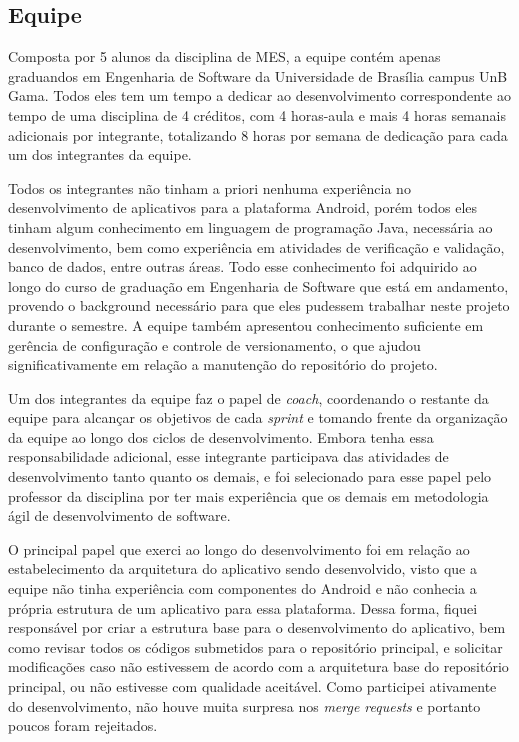 \subsection{Equipe}
Composta por 5 alunos da disciplina de MES, a equipe contém apenas graduandos em Engenharia de Software da Universidade de Brasília campus UnB Gama. Todos eles tem um tempo a dedicar ao desenvolvimento correspondente ao tempo de uma disciplina de 4 créditos, com 4 horas-aula e mais 4 horas semanais adicionais por integrante, totalizando 8 horas por semana de dedicação para cada um dos integrantes da equipe.

Todos os integrantes não tinham a priori nenhuma experiência no desenvolvimento de aplicativos para a plataforma Android, porém todos eles tinham algum conhecimento em linguagem de programação Java, necessária ao desenvolvimento, bem como experiência em atividades de verificação e validação, banco de dados, entre outras áreas. Todo esse conhecimento foi adquirido ao longo do curso de graduação em Engenharia de Software que está em andamento, provendo o background necessário para que eles pudessem trabalhar neste projeto durante o semestre. A equipe também apresentou conhecimento suficiente em gerência de configuração e controle de versionamento, o que ajudou significativamente em relação a manutenção do repositório do projeto.

Um dos integrantes da equipe faz o papel de \textit{coach}, coordenando o restante da equipe para alcançar os objetivos de cada \textit{sprint} e tomando frente da organização da equipe ao longo dos ciclos de desenvolvimento. Embora tenha essa responsabilidade adicional, esse integrante participava das atividades de desenvolvimento tanto quanto os demais, e foi selecionado para esse papel pelo professor da disciplina por ter mais experiência que os demais em metodologia ágil de desenvolvimento de software.

O principal papel que exerci ao longo do desenvolvimento foi em relação ao estabelecimento da arquitetura do aplicativo sendo desenvolvido, visto que a equipe não tinha experiência com componentes do Android e não conhecia a própria estrutura de um aplicativo para essa plataforma. Dessa forma, fiquei responsável por criar a estrutura base para o desenvolvimento do aplicativo, bem como revisar todos os códigos submetidos para o repositório principal, e solicitar modificações caso não estivessem de acordo com a arquitetura base do repositório principal, ou não estivesse com qualidade aceitável. Como participei ativamente do desenvolvimento, não houve muita surpresa nos \textit{merge requests} e portanto poucos foram rejeitados.

